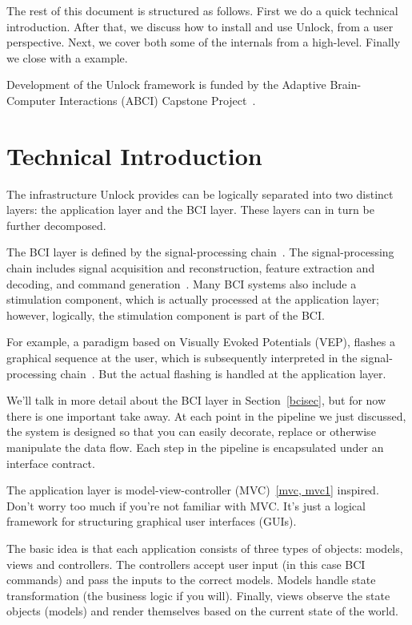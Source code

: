 \documentclass[11pt]{article}
\begin{document}
The rest of this document is structured as follows.  %
First we do a quick technical introduction.  After that, we discuss how to install and use Unlock, from a user perspective.  Next, we cover both some of the internals from a high-level.  Finally we close with a example.

Development of the Unlock framework is funded by the Adaptive Brain-Computer Interactions (ABCI) Capstone Project~\cite{abci}.

\section{Technical Introduction}

The infrastructure Unlock provides can be logically separated into two distinct layers: the application layer and the BCI layer.  These layers can in turn be further decomposed.

The BCI layer is defined by the signal-processing chain~\cite{signalprocessing}.  The signal-processing chain includes signal acquisition and reconstruction, feature extraction and decoding, and command generation~\cite{neuraleng}.  Many BCI systems also include a stimulation component, which is actually processed at the application layer; however, logically, the stimulation component is part of the BCI.

For example, a paradigm based on Visually Evoked Potentials (VEP), flashes a graphical sequence at the user, which is subsequently interpreted in the signal-processing chain~\cite{vep}.  But the actual flashing is handled at the application layer.

We'll talk in more detail about the BCI layer in Section~\ref{bcisec}, but for now there is one important take away.  At each point in the pipeline we just discussed, the system is designed so that you can easily decorate, replace or otherwise manipulate the data flow.  Each step in the pipeline is encapsulated under an interface contract.

The application layer is model-view-controller (MVC)~\ref{mvc, mvc1} inspired.  Don't worry too much if you're not familiar with MVC.  It's just a logical framework for structuring graphical user interfaces (GUIs).  

The basic idea is that each application consists of three types of objects: models, views and controllers.  The controllers accept user input (in this case BCI commands) and pass the inputs to the correct models.  Models handle state transformation (the business logic if you will).  Finally, views observe the state objects (models) and render themselves based on the current state of the world.
\end{document}
